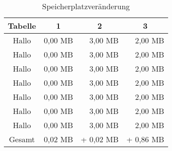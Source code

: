 \begin{table}[h]
	\centering
	\begin{tabular}{|c|r|r|r|}
		\hline
		\multicolumn{1}{|c|}{Tabelle} & \multicolumn{1}{c|}{1} & \multicolumn{1}{c|}{2} & \multicolumn{1}{c|}{3}	\\
		\hline
		Hallo   	& 	   0,00 MB 		& 3,00 MB 		&  2,00 MB 		\\
		Hallo   	& 	   0,00 MB 		& 3,00 MB 		&  2,00 MB 		\\
		Hallo   	& 	   0,00 MB 		& 3,00 MB 		&  2,00 MB 		\\
		Hallo   	& 	   0,00 MB 		& 3,00 MB 		&  2,00 MB 		\\
		Hallo   	& 	   0,00 MB 		& 3,00 MB 		&  2,00 MB 		\\
		Hallo   	& 	   0,00 MB 		& 3,00 MB 		&  2,00 MB 		\\
		Hallo   	& 	   0,00 MB 		& 3,00 MB 		&  2,00 MB 		\\
		\hline
		Gesamt								& 0,02 MB		& \cellcolor{yellow!25} + 0,02 MB		&  \cellcolor{red!25} + 0,86 MB		\\
		\hline
	\end{tabular}
	\caption{Speicherplatzveränderung}
\end{table}
